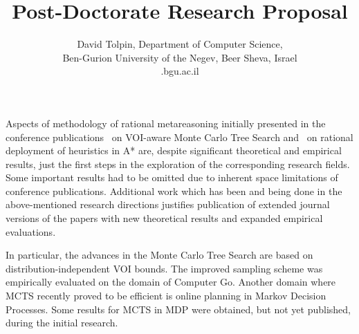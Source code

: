 \documentclass{article}
\title{Post-Doctorate Research Proposal}
\author {David Tolpin,
Department of Computer Science, \\
Ben-Gurion University of the Negev, Beer Sheva, Israel \\
\tolpin@cs.bgu.ac.il}
\begin{document}
Aspects of methodology of rational metareasoning initially
presented in the conference
publications~\cite{TolpinShimony.mcts,HayRussellTolpinShimony.selecting}
on VOI-aware Monte Carlo Tree Search and~\cite{tolpinetal.rla}
on rational deployment of heuristics in A* are, despite
significant theoretical and empirical results, just the first
steps in the exploration of the corresponding research fields.
Some important results had to be omitted due to inherent space
limitations of conference publications.  Additional work which
has been and being done in the above-mentioned research directions
justifies publication of extended journal versions of the papers
with new theoretical results and expanded empirical evaluations.  

In particular, the advances in the Monte Carlo Tree Search are based
on distribution-independent VOI bounds. The improved sampling
scheme was empirically evaluated on the domain of Computer Go.
Another domain where MCTS recently proved to be efficient is
online planning in Markov Decision Processes. Some
results for MCTS in MDP were obtained, but not yet published,
during the initial research. 

\maketitle


\end{document}
